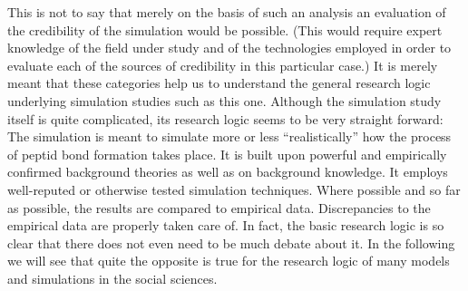 \documentclass[onecollarge]{STJour}
\numberwithin{equation}{section}
\begin{document}
This is not to say that merely on the basis of such an analysis an
evaluation of the credibility of the simulation would be possible. (This
would require expert knowledge of the field under study and of the
technologies employed in order to evaluate each of the sources of
credibility in this particular case.) It is merely meant that these
categories help us to understand the general research logic underlying
simulation studies such as this one. Although the simulation study itself
is quite complicated, its research logic seems to be very straight
forward: The simulation is meant to simulate more or less
``realistically'' how the process of peptid bond formation takes place.
It is built upon powerful and empirically confirmed background theories
as well as on background knowledge. It employs well-reputed or otherwise
tested simulation techniques. Where possible and so far as possible,
the results are compared to empirical data. Discrepancies to the empirical
data are properly taken care of. In fact, the basic research logic is so
clear that there does not even need to be much debate about it. In the
following we will see that quite the opposite is true for the research
logic of many models and simulations in the social sciences.

% 
\end{document}
